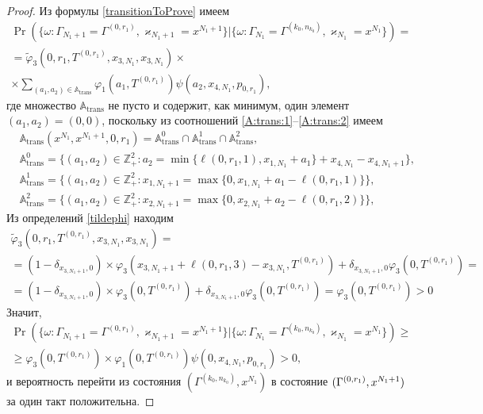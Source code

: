 \documentclass[a4paper,12pt,russian]{extarticle}
\begin{document}
\begin{proof}
Из формулы \eqref{transitionToProve} имеем
\begin{multline*}
\Pr (\{\omega\colon \Gamma_{N_1+1}=\Gamma^{(0,r_1)},\varkappa_{N_1+1}=x^{N_1+1} \}|\{\omega\colon  \Gamma_{N_1}=\Gamma^{(k_0,n_{k_0})},\varkappa_{N_1}=x^{N_1}\})=\\
=\widetilde{\varphi}_3(0,r_1,T^{(0,r_1)},x_{3,N_1},x_{3,N_1})\times \\
\times
\sum_{(a_1,a_2)\in {\mathbb A}_{\mathrm{trans}}}\varphi_1(a_1,T^{(0,r_1)})  \psi(a_2,x_{4,N_1}, p_{0,r_1}),
\end{multline*}
где множество ${\mathbb A}_{\mathrm{trans}}$ не пусто и содержит, как минимум, один элемент $(a_1,a_2)=(0,0)$, поскольку из соотношений \eqref{A:trans:1}--\eqref{A:trans:2} имеем
\begin{align*}
&{\mathbb A}_{\mathrm{trans}}(x^{N_1},x^{N_1+1},0,r_1) = {\mathbb A}_{\mathrm{trans}}^0 \cap {\mathbb A}_{\mathrm{trans}}^1\cap {\mathbb A}_{\mathrm{trans}}^2,\\
&{\mathbb A}_{\mathrm{trans}}^0 = \{(a_1,a_2) \in \mathbb{Z}_+^2 \colon a_2 = \min{\{\ell(0,r_1,1), x_{1,N_1}+a_1}\} +x_{4,N_1}-x_{4,N_1+1} \}, \\
&{\mathbb A}_{\mathrm{trans}}^1 = \{(a_1,a_2) \in \mathbb{Z}_+^2 \colon x_{1,N_1+1} =\max{\{0,x_{1,N_1}+a_1-\ell(0,r_1,1)\}}\},\\
& {\mathbb A}_{\mathrm{trans}}^2 = \{(a_1,a_2) \in \mathbb{Z}_+^2 \colon  x_{2,N_1+1}=\max{\{0,x_{2,N_1}+a_2-\ell(0,r_1,2)\}}\},
\end{align*}
Из определений \eqref{tildephi} находим
\begin{multline*}
\widetilde{\varphi}_3(0,r_1,T^{(0,r_1)},x_{3,N_1},x_{3,N_1})=\\=(1-\delta_{x_{3,N_1+1},0}) \times\varphi_3(x_{3,N_1+1} + \ell (0,r_1,3) - x_{3,N_1},T^{(0,r_1)} )
+\delta_{x_{3,N_1+1},0} \varphi_3 (0,T^{(0,r_1)}) = \\=
(1-\delta_{x_{3,N_1+1},0}) \times\varphi_3(0,T^{(0,r_1)} )
+\delta_{x_{3,N_1+1},0} \varphi_3 (0,T^{(0,r_1)}) = \varphi_3 (0,T^{(0,r_1)})> 0
\end{multline*}
Значит,
\begin{multline*}
\Pr (\{\omega\colon \Gamma_{N_1+1}=\Gamma^{(0,r_1)},\varkappa_{N_1+1}=x^{N_1+1} \}|\{\omega\colon  \Gamma_{N_1}=\Gamma^{(k_0,n_{k_0})},\varkappa_{N_1}=x^{N_1}\})\geqslant\\
\geqslant\varphi_3 (0,T^{(0,r_1)})
\times
\varphi_1(0,T^{(0,r_1)})  \psi(0,x_{4,N_1}, p_{0,r_1}) > 0,
\end{multline*}
и вероятность перейти из состояния $(\Gamma^{(k_0,n_{k_0})}, x^{N_1})$ в состояние $ (\Gamma^{(0,r_1)}, \hm{} x^{N_1+1})$ за один такт положительна.


\end{proof}
\end{document}

